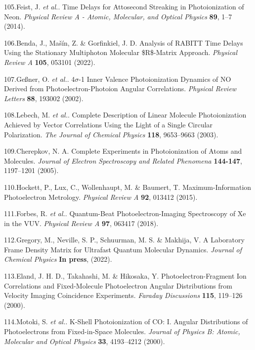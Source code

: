 \documentclass[10pt]{article}
\begin{document}
\label{csl:105}105.Feist, J. \textit{et al.}. {Time Delays for Attosecond Streaking in Photoionization of Neon}. \textit{Physical Review A - Atomic, Molecular, and Optical Physics} \textbf{89}, 1–7 (2014).

\label{csl:106}106.Benda, J., Ma{\v s}{\'i}n, Z. \& Gorfinkiel, J. D. {Analysis of {{RABITT}} Time Delays Using the Stationary Multiphoton Molecular \${{R}}\$-Matrix Approach}. \textit{Physical Review A} \textbf{105}, 053101 (2022).

\label{csl:107}107.Ge{\ss}ner, O. \textit{et al.}. {4{$\sigma$}-1 {{Inner Valence Photoionization Dynamics}} of {{NO Derived}} from {{Photoelectron}}-{{Photoion Angular Correlations}}}. \textit{Physical Review Letters} \textbf{88}, 193002 (2002).

\label{csl:108}108.Lebech, M. \textit{et al.}. {Complete Description of Linear Molecule Photoionization Achieved by Vector Correlations Using the Light of a Single Circular Polarization}. \textit{The Journal of Chemical Physics} \textbf{118}, 9653–9663 (2003).

\label{csl:109}109.Cherepkov, N. A. {Complete Experiments in Photoionization of Atoms and Molecules}. \textit{Journal of Electron Spectroscopy and Related Phenomena} \textbf{144-147}, 1197–1201 (2005).

\label{csl:110}110.Hockett, P., Lux, C., Wollenhaupt, M. \& Baumert, T. {Maximum-Information Photoelectron Metrology}. \textit{Physical Review A} \textbf{92}, 013412 (2015).

\label{csl:111}111.Forbes, R. \textit{et al.}. {Quantum-Beat Photoelectron-Imaging Spectroscopy of {{Xe}} in the {{VUV}}}. \textit{Physical Review A} \textbf{97}, 063417 (2018).

\label{csl:112}112.Gregory, M., Neville, S. P., Schuurman, M. S. \& Makhija, V. {A {{Laboratory Frame Density Matrix}} for {{Ultrafast Quantum Molecular Dynamics}}}. \textit{Journal of Chemical Physics} \textbf{In press}, (2022).

\label{csl:113}113.Eland, J. H. D., Takahashi, M. \& Hikosaka, Y. {Photoelectron-Fragment Ion Correlations and Fixed-Molecule Photoelectron Angular Distributions from Velocity Imaging Coincidence Experiments}. \textit{Faraday Discussions} \textbf{115}, 119–126 (2000).

\label{csl:114}114.Motoki, S. \textit{et al.}. {K-Shell Photoionization of {{CO}}: {{I}}. {{Angular}} Distributions of Photoelectrons from Fixed-in-Space Molecules}. \textit{Journal of Physics B: Atomic, Molecular and Optical Physics} \textbf{33}, 4193–4212 (2000).
\end{document}
